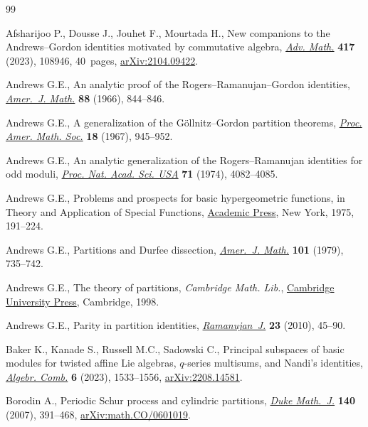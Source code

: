 \documentclass[10pt,a4paper]{amsart}
\numberwithin{equation}{section}
\theoremstyle{definition}
\begin{document}
\begin{thebibliography}{99}
\footnotesize\itemsep=0pt

Afsharijoo P., Dousse J., Jouhet F., Mourtada H., New companions to the
 {A}ndrews--{G}ordon identities motivated by commutative algebra,
 \href{https://doi.org/10.1016/j.aim.2023.108946}{\textit{Adv. Math.}}
 \textbf{417} (2023), 108946, 40~pages,
 \href{http://arxiv.org/abs/2104.09422}{arXiv:2104.09422}.

Andrews G.E., An analytic proof of the {R}ogers--{R}amanujan--{G}ordon
 identities, \href{https://doi.org/10.2307/2373082}{\textit{Amer.~J. Math.}}
 \textbf{88} (1966), 844--846.

Andrews G.E., A generalization of the {G}\"{o}llnitz--{G}ordon partition
 theorems, \href{https://doi.org/10.2307/2035143}{\textit{Proc. Amer. Math.
 Soc.}} \textbf{18} (1967), 945--952.

Andrews G.E., An analytic generalization of the {R}ogers--{R}amanujan
 identities for odd moduli,
 \href{https://doi.org/10.1073/pnas.71.10.4082}{\textit{Proc. Nat. Acad. Sci.
 USA}} \textbf{71} (1974), 4082--4085.

Andrews G.E., Problems and prospects for basic hypergeometric functions, in
 Theory and {A}pplication of {S}pecial {F}unctions,
 \href{https://doi.org/10.1016/B978-0-12-064850-4.50008-2}{Academic Press}, New
 York, 1975, 191--224.

Andrews G.E., Partitions and {D}urfee dissection,
 \href{https://doi.org/10.2307/2373804}{\textit{Amer.~J. Math.}} \textbf{101}
 (1979), 735--742.

Andrews G.E., The theory of partitions, \textit{Cambridge Math. Lib.},
 \href{https://doi.org/10.1017/CBO9780511608650}{Cambridge University Press},
 Cambridge, 1998.

Andrews G.E., Parity in partition identities,
 \href{https://doi.org/10.1007/s11139-008-9150-0}{\textit{Ramanujan~J.}}
 \textbf{23} (2010), 45--90.

Baker K., Kanade S., Russell M.C., Sadowski C., Principal subspaces of basic
 modules for twisted affine {L}ie algebras, {$q$}-series multisums, and
 {N}andi's identities, \href{https://doi.org/10.5802/alco.311}{\textit{Algebr.
 Comb.}} \textbf{6} (2023), 1533--1556,
 \href{http://arxiv.org/abs/2208.14581}{arXiv:2208.14581}.

Borodin A., Periodic {S}chur process and cylindric partitions,
 \href{https://doi.org/10.1215/S0012-7094-07-14031-6}{\textit{Duke Math.~J.}}
 \textbf{140} (2007), 391--468,
 \href{http://arxiv.org/abs/math.CO/0601019}{arXiv:math.CO/0601019}.


\end{thebibliography}
\end{document}

